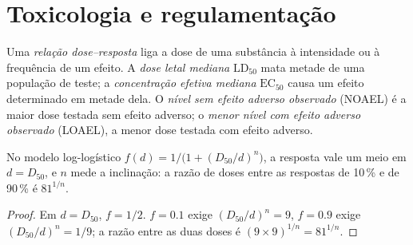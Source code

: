 \section{Toxicologia e regulamentação}

\begin{definition}\label{def:b3:environmental-toxicology:dose}
Uma \emph{relação dose--resposta} liga
a dose de uma substância à intensidade ou à frequência de um efeito. A \emph{dose letal
mediana} $\mathrm{LD_{50}}$ mata metade de uma população de teste; a
\emph{concentração efetiva mediana} $\mathrm{EC_{50}}$
causa um efeito determinado em metade dela. O \emph{nível sem efeito adverso
observado} (NOAEL) é a maior dose testada
sem efeito adverso; o \emph{menor nível com efeito adverso
observado} (LOAEL), a menor dose testada
com efeito adverso.
\end{definition}

\begin{proposition}\label{prop:b3:environmental-toxicology:dose-response}
No modelo log-logístico $f(d) = 1/\bigl(1 + (D_{50}/d)^n\bigr)$, a resposta vale um meio em $d = D_{50}$, e $n$
mede a inclinação: a razão de doses entre as respostas de 10\,\% e de 90\,\% é $81^{1/n}$.
\end{proposition}

\begin{proof}
Em $d = D_{50}$, $f = 1/2$. $f = 0.1$ exige $(D_{50}/d)^n = 9$, $f = 0.9$ exige $(D_{50}/d)^n = 1/9$; a razão entre as duas doses
é $(9 \times 9)^{1/n} = 81^{1/n}$.
\end{proof}

